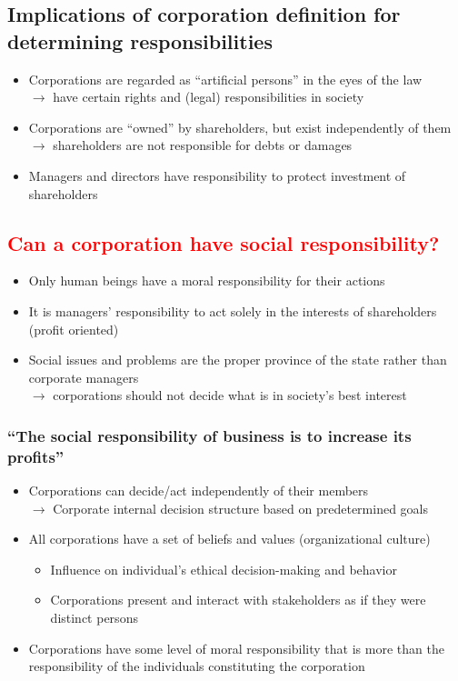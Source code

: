 \documentclass{article}
\DeclareRobustCommand{\k}[1]{\textcolor{red}{#1}}
\begin{document}
\subsection{Implications of corporation definition for determining responsibilities}
\begin{itemize}
    \item Corporations are regarded as ``artificial persons'' in the eyes of the law\\$\to$ have certain rights and (legal) responsibilities in society
    \item Corporations are ``owned'' by shareholders, but exist independently of them\\$\to$ shareholders are not responsible for debts or damages
    \item Managers and directors have responsibility to protect investment of shareholders
\end{itemize}

\subsection{\k{Can a corporation have social responsibility?}}
\begin{itemize}
    \item Only human beings have a moral responsibility for their actions
    \item It is managers' responsibility to act solely in the interests of shareholders (profit oriented)
    \item Social issues and problems are the proper province of the state rather than corporate managers\\$\to$ corporations should not decide what is in society's best interest
\end{itemize}

\subsubsection{``The social responsibility of business is to increase its profits''}
\begin{itemize}
    \item Corporations can decide/act independently of their members\\
        $\to$ Corporate internal decision structure based on predetermined goals
    \item All corporations have a set of beliefs and values (organizational culture)
    \begin{itemize}[label=$\to$]
        \item Influence on individual's ethical decision-making and behavior
        \item Corporations present and interact with stakeholders as if they were distinct persons
    \end{itemize}
    \item Corporations have some level of moral responsibility that is more than the responsibility of the individuals constituting the corporation
\end{itemize}
\end{document}
